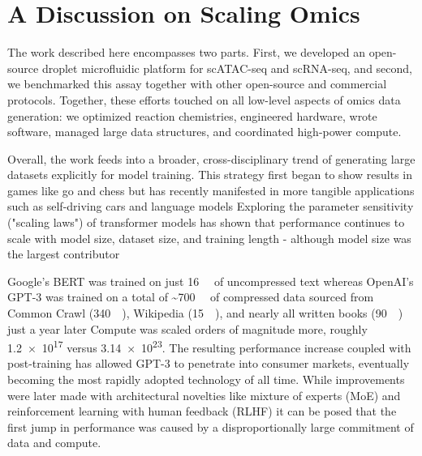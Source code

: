 \chapter{A Discussion on Scaling Omics}
The work described here encompasses two parts. First, we developed an open-source droplet microfluidic platform for scATAC-seq and scRNA-seq, and second, we benchmarked this assay together with other open-source and commercial protocols. Together, these efforts touched on all low-level aspects of omics data generation: we optimized reaction chemistries, engineered hardware, wrote software, managed large data structures, and coordinated high-power compute.

Overall, the work feeds into a broader, cross-disciplinary trend of generating large datasets explicitly for model training. This strategy first began to show results in games like go and chess but has recently manifested in more tangible applications such as self-driving cars and language models Exploring the parameter sensitivity ("scaling laws") of transformer models has shown that performance continues to scale with model size, dataset size, and training length - although model size was the largest contributor

Google's BERT was trained on just \SI{16}{\giga\byte} of uncompressed text whereas OpenAI's GPT-3 was trained on a total of \textasciitilde{\SI{700}{\giga\byte}} of compressed data sourced from Common Crawl (\SI{340}{\giga\byte}), Wikipedia (\SI{15}{\giga\byte}), and nearly all written books (\SI{90}{\giga\byte}) just a year later Compute was scaled orders of magnitude more, roughly \SI{1.2e17}{\flops} versus \SI{3.14e23}{\flops}. The resulting performance increase coupled with post-training has allowed GPT-3 to penetrate into consumer markets, eventually becoming the most rapidly adopted technology of all time. While improvements were later made with architectural novelties like mixture of experts (MoE) and reinforcement learning with human feedback (RLHF) it can be posed that the first jump in performance was caused by a disproportionally large commitment of data and compute.


